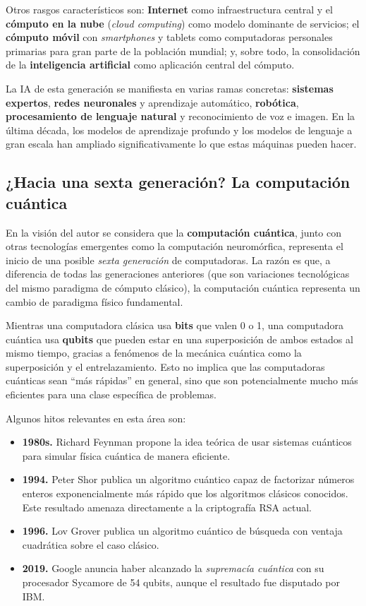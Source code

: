 \documentclass[10pt,letterpaper,twocolumn]{article}
\begin{document}
Otros rasgos característicos son: \textbf{Internet} como
infraestructura central y el \textbf{cómputo en la nube} (\emph{cloud
computing}) como modelo dominante de servicios; el \textbf{cómputo
móvil} con \emph{smartphones} y tablets como computadoras personales
primarias para gran parte de la población mundial; y, sobre todo, la
consolidación de la \textbf{inteligencia artificial} como aplicación
central del cómputo.

La IA de esta generación se manifiesta en varias ramas concretas:
\textbf{sistemas expertos}, \textbf{redes neuronales} y aprendizaje
automático, \textbf{robótica}, \textbf{procesamiento de lenguaje
natural} y reconocimiento de voz e imagen. En la última década, los
modelos de aprendizaje profundo y los modelos de lenguaje a gran escala
han ampliado significativamente lo que estas máquinas pueden hacer.

\subsection{¿Hacia una sexta generación? La computación cuántica}

En la visión del autor se considera que la \textbf{computación cuántica}, junto
con otras tecnologías emergentes como la computación neuromórfica,
representa el inicio de una posible \emph{sexta generación} de
computadoras. La razón es que, a diferencia de todas las generaciones
anteriores (que son variaciones tecnológicas del mismo paradigma de
cómputo clásico), la computación cuántica representa un cambio de
paradigma físico fundamental.

Mientras una computadora clásica usa \textbf{bits} que valen 0 o 1, una
computadora cuántica usa \textbf{qubits} que pueden estar en una
superposición de ambos estados al mismo tiempo, gracias a fenómenos de
la mecánica cuántica como la superposición y el entrelazamiento. Esto
no implica que las computadoras cuánticas sean ``más rápidas'' en
general, sino que son potencialmente mucho más eficientes para una
clase específica de problemas.

Algunos hitos relevantes en esta área son:

\begin{itemize}[leftmargin=*,itemsep=0.2em]
  \item \textbf{1980s.} Richard Feynman propone la idea teórica de usar
    sistemas cuánticos para simular física cuántica de manera eficiente.
  \item \textbf{1994.} Peter Shor publica un algoritmo cuántico capaz
    de factorizar números enteros exponencialmente más rápido que los
    algoritmos clásicos conocidos. Este resultado amenaza directamente
    a la criptografía RSA actual.
  \item \textbf{1996.} Lov Grover publica un algoritmo cuántico de
    búsqueda con ventaja cuadrática sobre el caso clásico.
  \item \textbf{2019.} Google anuncia haber alcanzado la
    \emph{supremacía cuántica} con su procesador Sycamore de 54
    qubits, aunque el resultado fue disputado por IBM.
\end{itemize}
\end{document}
